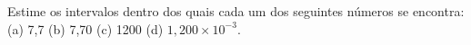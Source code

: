 Estime os intervalos dentro dos quais cada um dos seguintes números se encontra: (a) 7,7 (b) 7,70 (c) 1200 (d) $1,200 \times 10^{-3}$.

